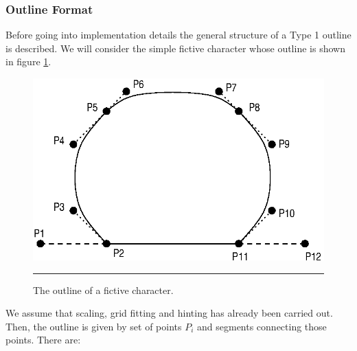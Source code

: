 \subsubsection{Outline Format}
\label{outlineformat}%
Before going into implementation details the general structure of a Type 1
outline is described. We will consider the simple fictive character whose
outline is shown in figure \ref{figure:generaloutline}. 
\begin{figure}[t]
\hfill
\includegraphics[scale=1.0]{outlines.eps}
\hfill\break
\vskip3mm
\hrule\vskip3mm\small
\caption{\label{figure:generaloutline}The outline of a fictive character.} 
\end{figure}
We assume that scaling, grid fitting and hinting has already been carried out.
Then, the outline is given by set of points $P_i$ and segments connecting those
points. There are:
